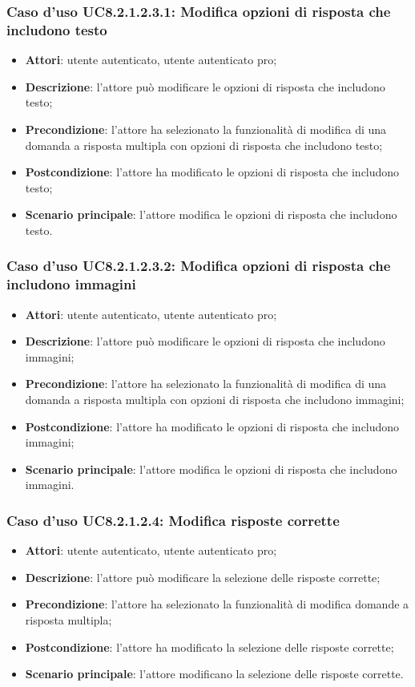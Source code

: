 \subsubsection{Caso d'uso UC8.2.1.2.3.1: Modifica opzioni di risposta che includono testo}
	\begin{itemize}
		\item
			\textbf{Attori}: utente autenticato, utente autenticato pro;
		\item		
			\textbf{Descrizione}: l'attore può modificare le opzioni di risposta che includono testo;
		\item
			\textbf{Precondizione}: l'attore ha selezionato la funzionalità di modifica di una domanda a risposta multipla con opzioni di risposta che includono testo; 
		\item
			\textbf{Postcondizione}: l'attore ha modificato le opzioni di risposta che includono testo;
		\item
			\textbf{Scenario principale}: l'attore modifica le opzioni di risposta che includono testo. 			
	\end{itemize}	
	
\subsubsection{Caso d'uso UC8.2.1.2.3.2: Modifica opzioni di risposta che includono immagini}
	\begin{itemize}
		\item
			\textbf{Attori}: utente autenticato, utente autenticato pro;
		\item		
			\textbf{Descrizione}: l'attore può modificare le opzioni di risposta che includono immagini;
		\item
			\textbf{Precondizione}: l'attore ha selezionato la funzionalità di modifica di una domanda a risposta multipla con opzioni di risposta che includono immagini; 
		\item
			\textbf{Postcondizione}: l'attore ha modificato le opzioni di risposta che includono immagini;
		\item
			\textbf{Scenario principale}: l'attore modifica le opzioni di risposta che includono immagini. 			
	\end{itemize}
	
\subsubsection{Caso d'uso UC8.2.1.2.4: Modifica risposte corrette}
	\begin{itemize}
		\item
			\textbf{Attori}: utente autenticato, utente autenticato pro;
		\item		
			\textbf{Descrizione}: l'attore può modificare la selezione delle risposte corrette;
		\item
			\textbf{Precondizione}: l'attore ha selezionato la funzionalità di modifica domande a risposta multipla; 
		\item
			\textbf{Postcondizione}: l'attore ha modificato la selezione delle risposte corrette;
		\item
			\textbf{Scenario principale}: l'attore modificano la selezione delle risposte corrette. 			
	\end{itemize}

	
	
	
	
	
	
	